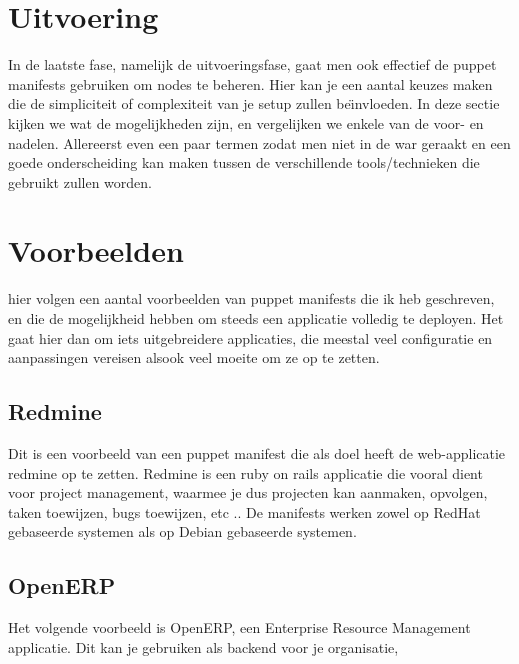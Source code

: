 \section{Uitvoering}
In de laatste fase, namelijk de uitvoeringsfase, gaat men ook effectief de puppet manifests gebruiken om nodes te beheren. Hier kan je een aantal keuzes maken die de simpliciteit of complexiteit van je setup zullen be\"{\i}nvloeden. In deze sectie kijken we wat de mogelijkheden zijn, en vergelijken we enkele van de voor- en nadelen.
Allereerst even een paar termen zodat men niet in de war geraakt en een goede onderscheiding kan maken tussen de verschillende tools/technieken die gebruikt zullen worden.
 
\section{Voorbeelden}
hier volgen een aantal voorbeelden van puppet manifests die ik heb geschreven, en die de mogelijkheid hebben om steeds een applicatie volledig te deployen. Het gaat hier dan om iets uitgebreidere applicaties, die meestal veel configuratie en aanpassingen vereisen alsook veel moeite om ze op te zetten.

\subsection{Redmine}
Dit is een voorbeeld van een puppet manifest die als doel heeft de web-applicatie redmine op te zetten. Redmine is een ruby on rails applicatie die vooral dient voor project management, waarmee je dus projecten kan aanmaken, opvolgen, taken toewijzen, bugs toewijzen, etc ..
De manifests werken zowel op RedHat gebaseerde systemen als op Debian gebaseerde systemen.

\subsection{OpenERP}
Het volgende voorbeeld is OpenERP, een Enterprise Resource Management applicatie. Dit kan je gebruiken als backend voor je organisatie,
